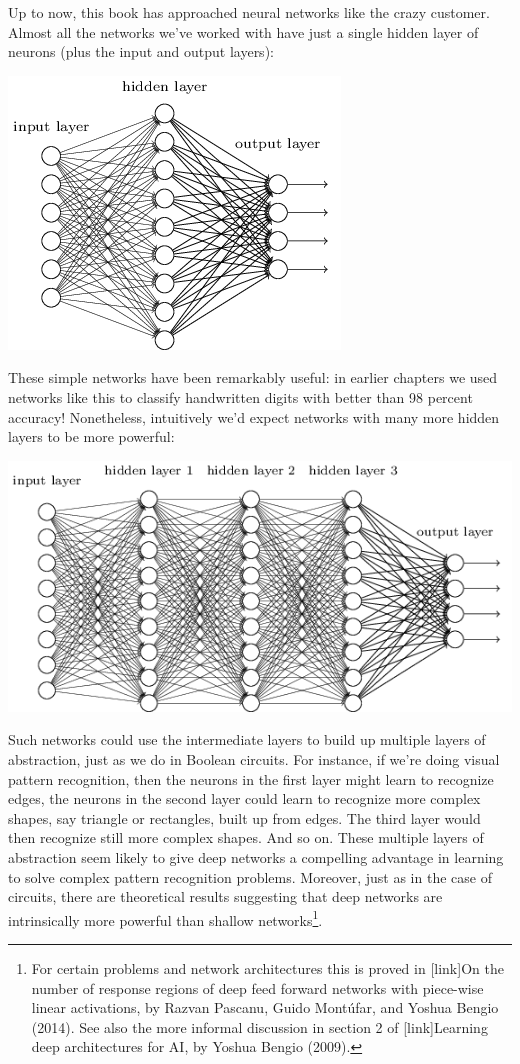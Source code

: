 \documentclass[a4paper,twoside,10pt]{book}
\begin{document}
Up to now, this book has approached neural networks like the crazy customer. Almost all the networks we've worked with have just a single hidden layer of neurons (plus the input and output layers):
\begin{center}
	\includegraphics[width=0.5\linewidth]{figures/ch5/tikz35}
\end{center}

These simple networks have been remarkably useful: in earlier chapters we used networks like this to classify handwritten digits with better than 98 percent accuracy! Nonetheless, intuitively we'd expect networks with many more hidden layers to be more powerful:
\begin{center}
	\includegraphics[width=0.7\linewidth]{figures/ch5/tikz36}
\end{center}

Such networks could use the intermediate layers to build up multiple layers of abstraction, just as we do in Boolean circuits. For instance, if we're doing visual pattern recognition, then the neurons in the first layer might learn to recognize edges, the neurons in the second layer could learn to recognize more complex shapes, say triangle or rectangles, built up from edges. The third layer would then recognize still more complex shapes. And so on. These multiple layers of abstraction seem likely to give deep networks a compelling advantage in learning to solve complex pattern recognition problems. Moreover, just as in the case of circuits, there are theoretical results suggesting that deep networks are intrinsically more powerful than shallow networks\footnote{For certain problems and network architectures this is proved in [link]On the number of response regions of deep feed forward networks with piece-wise linear activations, by Razvan Pascanu, Guido Mont\'ufar, and Yoshua Bengio (2014). See also the more informal discussion in section 2 of [link]Learning deep architectures for AI, by Yoshua Bengio (2009).}.
\end{document}
